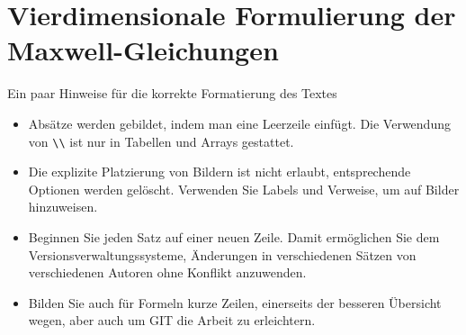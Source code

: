 %
%
%
%
\chapter{Vierdimensionale Formulierung der Maxwell-Gleichungen\label{chapter:maxwell}}
\begin{refsection}

Ein paar Hinweise für die korrekte Formatierung des Textes
\begin{itemize}
\item
Absätze werden gebildet, indem man eine Leerzeile einfügt.
Die Verwendung von \verb+\\+ ist nur in Tabellen und Arrays gestattet.
\item
Die explizite Platzierung von Bildern ist nicht erlaubt, entsprechende
Optionen werden gelöscht. 
Verwenden Sie Labels und Verweise, um auf Bilder hinzuweisen.
\item
Beginnen Sie jeden Satz auf einer neuen Zeile. 
Damit ermöglichen Sie dem Versionsverwaltungssysteme, Änderungen
in verschiedenen Sätzen von verschiedenen Autoren ohne Konflikt 
anzuwenden.
\item 
Bilden Sie auch für Formeln kurze Zeilen, einerseits der besseren
Übersicht wegen, aber auch um GIT die Arbeit zu erleichtern.
\end{itemize}







\printbibliography[heading=subbibliography]
\end{refsection}
